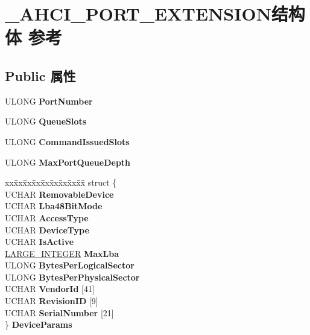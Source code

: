 \hypertarget{struct___a_h_c_i___p_o_r_t___e_x_t_e_n_s_i_o_n}{}\section{\+\_\+\+A\+H\+C\+I\+\_\+\+P\+O\+R\+T\+\_\+\+E\+X\+T\+E\+N\+S\+I\+O\+N结构体 参考}
\label{struct___a_h_c_i___p_o_r_t___e_x_t_e_n_s_i_o_n}
\subsection*{Public 属性}
\begin{DoxyCompactItemize}
\item 
\mbox{\label{struct___a_h_c_i___p_o_r_t___e_x_t_e_n_s_i_o_n_add19882c2b8a38c262ef1a1aaad67cc8}} 
U\+L\+O\+NG {\bfseries Port\+Number}
\item 
\mbox{\label{struct___a_h_c_i___p_o_r_t___e_x_t_e_n_s_i_o_n_aa7a51d9da0ffa43387f369f809c25de1}} 
U\+L\+O\+NG {\bfseries Queue\+Slots}
\item 
\mbox{\label{struct___a_h_c_i___p_o_r_t___e_x_t_e_n_s_i_o_n_aabdc6e5972972883fa65a1883f356647}} 
U\+L\+O\+NG {\bfseries Command\+Issued\+Slots}
\item 
\mbox{\label{struct___a_h_c_i___p_o_r_t___e_x_t_e_n_s_i_o_n_a6ba976976c0f605878da1c55f1bcf202}} 
U\+L\+O\+NG {\bfseries Max\+Port\+Queue\+Depth}
\item 
\mbox{\label{struct___a_h_c_i___p_o_r_t___e_x_t_e_n_s_i_o_n_ac8765d13626b4f25c767271d07151855}} 
\begin{tabbing}
xx\=xx\=xx\=xx\=xx\=xx\=xx\=xx\=xx\=\kill
struct \{\\
\>UCHAR {\bfseries RemovableDevice}\\
\>UCHAR {\bfseries Lba48BitMode}\\
\>UCHAR {\bfseries AccessType}\\
\>UCHAR {\bfseries DeviceType}\\
\>UCHAR {\bfseries IsActive}\\
\>\hyperlink{union___l_a_r_g_e___i_n_t_e_g_e_r}{LARGE\_INTEGER} {\bfseries MaxLba}\\
\>ULONG {\bfseries BytesPerLogicalSector}\\
\>ULONG {\bfseries BytesPerPhysicalSector}\\
\>UCHAR {\bfseries VendorId} \mbox{[}41\mbox{]}\\
\>UCHAR {\bfseries RevisionID} \mbox{[}9\mbox{]}\\
\>UCHAR {\bfseries SerialNumber} \mbox{[}21\mbox{]}\\
\} {\bfseries DeviceParams}\\


\end{tabbing}
\end{DoxyCompactItemize}
